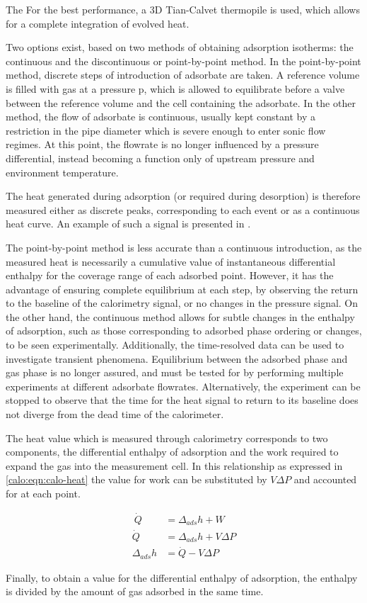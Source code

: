 The 
For the best performance, a 3D Tian-Calvet thermopile is used, which
allows for a complete integration of evolved heat.

Two options exist, based on two methods of obtaining adsorption isotherms:
the continuous and the discontinuous or point-by-point method. In
the point-by-point method, discrete steps of introduction of adsorbate 
are taken. A reference volume is filled with gas at a pressure p, which
is allowed to equilibrate before a valve between the reference volume 
and the cell containing the adsorbate. 
In the other method, the flow of adsorbate is continuous, usually kept 
constant by a restriction in the pipe diameter which is severe enough
to enter sonic flow regimes. At this point, the flowrate is no longer 
influenced by a pressure differential, instead becoming a function only
of upstream pressure and environment temperature.

The heat generated during adsorption (or required during desorption)
is therefore measured either as discrete peaks, corresponding to 
each event or as a continuous heat curve. An example of such a signal 
is presented in .

The point-by-point method is less accurate than a continuous introduction,
as the measured heat is necessarily a cumulative value of instantaneous
differential enthalpy for the coverage range of each adsorbed point.
However, it has the advantage of ensuring complete equilibrium at 
each step, by observing the return to the baseline of the calorimetry
signal, or no changes in the pressure signal. On the other hand, the 
continuous method allows for subtle changes in the enthalpy of 
adsorption, such as those corresponding to adsorbed phase ordering or 
changes, to be seen experimentally. Additionally, the time-resolved data
can be used to investigate transient phenomena. Equilibrium between 
the adsorbed phase and gas phase is no longer assured, and must be
tested for by performing multiple experiments at different adsorbate
flowrates. Alternatively, the experiment can be stopped to observe that the 
time for the heat signal to return to its baseline does not diverge 
from the dead time of the calorimeter.

The heat value which is measured through calorimetry corresponds to 
two components, the differential enthalpy of adsorption and the 
work required to expand the gas into the measurement cell.
In this relationship as expressed in \autoref{calo:eqn:calo-heat}
the value for work can be substituted by \(V\Delta P\) and 
accounted for at each point.

\begin{align}\
  \dot{Q} & = \Delta_{ads} h + W \label{calo:eqn:calo-heat} \\
  \dot{Q} & = \Delta_{ads} h + V\Delta P \\
  \Delta_{ads} h & = \dot{Q} - V\Delta P
\end{align}

Finally, to obtain a value for the differential enthalpy of adsorption,
the enthalpy is divided by the amount of gas adsorbed in the same 
time.